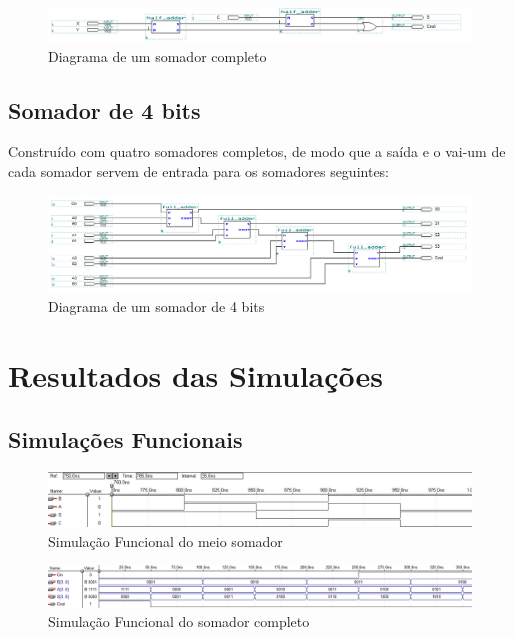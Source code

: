 \documentclass[a4paper]{article}
\begin{document}
\begin{figure}[h!]
  \centering
  \includegraphics[scale=0.5]{full_adder.png}
  \caption{Diagrama de um somador completo}
\end{figure}


\FloatBarrier
\subsection{Somador de 4 bits}
	Construído com quatro somadores completos, de modo que a saída e o 
vai-um de cada somador servem de entrada para os somadores seguintes:
\begin{figure}[h]
  \centering
  \includegraphics[scale=0.5]{4bit_adder.png}
  \caption{Diagrama de um somador de 4 bits}
\end{figure}

\newpage
\FloatBarrier
\section{Resultados das Simulações}

\subsection{Simulações Funcionais}
\begin{figure}[h]
  \centering
  \includegraphics[scale=0.3]{sim_func_half_adder.png}
  \caption{Simulação Funcional do meio somador}
\end{figure}

\begin{figure}[h]
  \centering
  \includegraphics[scale=0.3]{sim_func_full_adder.png}
  \caption{Simulação Funcional do somador completo}
\end{figure}
\end{document}
